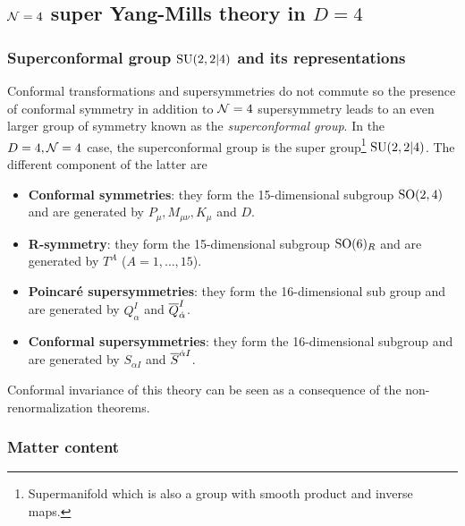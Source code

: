     
    \subsection{$\mathcal{N}=4$ super Yang-Mills theory in $D=4$}\label{sec:N4SCFT}

        \subsubsection{Superconformal group $\text{SU}(2,2|4)$ and its representations}

            Conformal transformations and supersymmetries do not commute so the presence of conformal symmetry in addition to $\mathcal{N}=4$ supersymmetry leads to an even larger group of symmetry known as the \emph{superconformal group}. In the $D=4,\mathcal{N}=4$ case, the superconformal group is the super group\footnote{Supermanifold which is also a group with smooth product and inverse maps.} $\text{SU}(2,2|4)$. The different component of the latter are
            \begin{itemize}
                \item \textbf{Conformal symmetries}: they form the 15-dimensional subgroup $\text{SO}(2,4)$ and are generated by $P_\mu,M_{\mu\nu},K_\mu$ and $D$.
                \item \textbf{R-symmetry}: they form the 15-dimensional subgroup $\text{SO}(6)_R$ and are generated by $T^A$ ($A=1,\dots,15$).
                \item \textbf{Poincaré supersymmetries}: they form the 16-dimensional sub group  and are generated by $Q^I_\alpha$ and $\overline{Q}^I_{\dot{\alpha}}$.
                \item \textbf{Conformal supersymmetries}: they form the 16-dimensional subgroup  and are generated by $S_{\alpha I}$ and $\overline{S}^{\dot{\alpha} I}$.
            \end{itemize}

            Conformal invariance of this theory can be seen as a consequence of the non-renormalization theorems.

        \subsubsection{Matter content}
            

